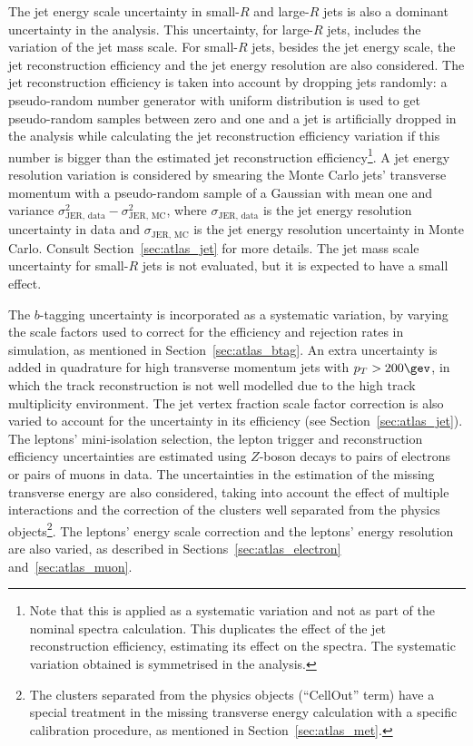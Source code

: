 The jet energy scale uncertainty in small-$R$ and large-$R$ jets is also a dominant uncertainty in the analysis. This uncertainty, for large-$R$ jets, includes
the variation of the jet mass scale.
For small-$R$ jets, besides the jet energy scale, the jet reconstruction efficiency and the jet
energy resolution are also considered. The jet reconstruction efficiency is taken into account by dropping jets randomly: a pseudo-random number generator with
uniform distribution is used to get pseudo-random samples between zero and one and a jet is artificially dropped in the analysis while calculating
the jet reconstruction efficiency variation if this number is bigger than the estimated jet reconstruction efficiency\footnote{Note that this is applied as a
systematic variation and not as part of the nominal spectra calculation. This duplicates the effect of the jet reconstruction efficiency, estimating its
effect on the spectra. The systematic variation obtained is symmetrised in the analysis.}.
A jet energy resolution variation is considered
by smearing the Monte Carlo jets' transverse momentum with a pseudo-random sample of a Gaussian with mean one and variance
$\sigma_{\textrm{JER, data}}^2 - \sigma_{\textrm{JER, MC}}^2$, where $\sigma_{\textrm{JER, data}}$ is the jet energy resolution uncertainty in data and $\sigma_{\textrm{JER, MC}}$
is the jet energy resolution uncertainty in Monte Carlo. Consult Section~\ref{sec:atlas_jet} for more details.
The jet mass scale uncertainty for small-$R$ jets is not evaluated, but
it is expected to have a small effect.

The $b$-tagging uncertainty is incorporated as a systematic variation, by varying the scale factors used to correct for the efficiency and rejection rates
in simulation, as mentioned in Section~\ref{sec:atlas_btag}.
An extra uncertainty is added in quadrature for high transverse momentum jets with $p_T > 200\gev$, in which the track reconstruction is not
well modelled due to the high track multiplicity environment. The jet vertex fraction scale factor correction is also varied to account for the uncertainty
in its efficiency (see Section~\ref{sec:atlas_jet}).
The leptons' mini-isolation selection, the lepton trigger and reconstruction efficiency uncertainties are estimated using $Z$-boson decays
to pairs of electrons or pairs of muons in data. The uncertainties in the estimation of the missing transverse energy are also considered, taking into account the effect
of multiple interactions and the correction of the clusters well separated from the physics objects\footnote{The clusters separated from the physics objects (``CellOut'' term)
have a special treatment in the missing transverse energy calculation with a specific calibration procedure, as mentioned in Section~\ref{sec:atlas_met}.}.
The leptons' energy scale correction and the leptons'
energy resolution are also varied, as described in Sections~\ref{sec:atlas_electron} and~\ref{sec:atlas_muon}.

